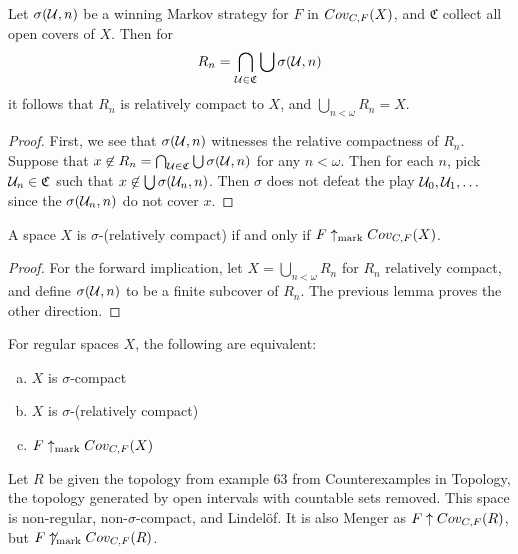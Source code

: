   \begin{lemma}
    Let $\sigma(\mathcal{U}, n)$ be a winning Markov strategy for $F$ in $Cov_{C,F}(X)$, and $\mathfrak{C}$ collect all open covers of $X$. Then for
      \[
        R_n = \bigcap_{\mathcal{U}\in\mathfrak{C}} \bigcup\sigma(\mathcal{U},n)
      \]
    it follows that $R_n$ is relatively compact to $X$, and $\bigcup_{n<\omega} R_n = X$.
  \end{lemma}

  \begin{proof}
    First, we see that $\sigma(\mathcal{U},n)$ witnesses the relative compactness of $R_n$. Suppose that $x \not\in R_n = \bigcap_{\mathcal{U}\in\mathfrak{C}} \bigcup\sigma(\mathcal{U},n)$ for any $n<\omega$. Then for each $n$, pick $\mathcal{U}_n\in\mathfrak{C}$ such that $x\not\in \bigcup\sigma(\mathcal{U}_n,n)$. Then $\sigma$ does not defeat the play $\mathcal{U}_0,\mathcal{U}_1,\dots$ since the $\sigma(\mathcal{U}_n,n)$ do not cover $x$.
  \end{proof}

  \begin{theorem}
    A space $X$ is $\sigma$-(relatively compact) if and only if $F \uparrow_{\text{mark}} Cov_{C,F}(X)$.
  \end{theorem}

  \begin{proof}
    For the forward implication, let $X=\bigcup_{n<\omega}R_n$ for $R_n$ relatively compact, and define $\sigma(\mathcal{U},n)$ to be a finite subcover of $R_n$. The previous lemma proves the other direction.
  \end{proof}

  \begin{corollary}
    For regular spaces $X$, the following are equivalent:
      \begin{enumerate}[(a)]
        \item $X$ is $\sigma$-compact
        \item $X$ is $\sigma$-(relatively compact)
        \item $F \uparrow_{\text{mark}} Cov_{C,F}(X)$
      \end{enumerate}
  \end{corollary}

  \begin{example}
  Let $R$ be given the topology from example 63 from Counterexamples in Topology, the topology generated by open intervals with countable sets removed. This space is non-regular, non-$\sigma$-compact, and Lindel\"of. It is also Menger as $F \uparrow Cov_{C,F}(R)$, but $F \not\uparrow_{\text{mark}} Cov_{C,F}(R)$.
  \end{example}

